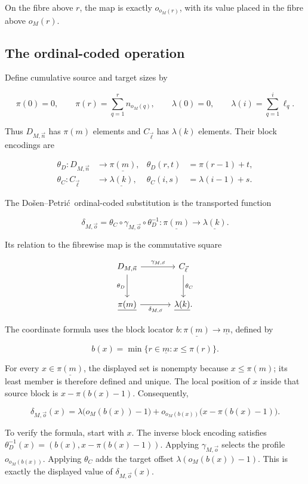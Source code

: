 \documentclass[11pt]{article}
\newcommand{\finord}[1]{\underline{#1}}
\newcommand{\DP}{Do\v{s}en--Petri\'{c}}
\theoremstyle{definition}
\begin{document}
On the fibre above \(r\), the map is exactly
\(o_{o_M(r)}\), with its value placed in the fibre above \(o_M(r)\).

\subsection{The ordinal-coded operation}

Define cumulative source and target sizes by

\[
\pi(0)=0,\qquad
\pi(r)=\sum_{q=1}^{r}n_{o_M(q)},
\qquad
\lambda(0)=0,\qquad
\lambda(i)=\sum_{q=1}^{i}\ell_q.
\]

Thus \(D_{M,\vec n}\) has \(\pi(m)\) elements and
\(C_{\vec\ell}\) has \(\lambda(k)\) elements. Their block encodings are

\[
\begin{aligned}
\theta_D:D_{M,\vec n}&\longrightarrow\finord{\pi(m)},
&\theta_D(r,t)&=\pi(r-1)+t,\\
\theta_C:C_{\vec\ell}&\longrightarrow\finord{\lambda(k)},
&\theta_C(i,s)&=\lambda(i-1)+s.
\end{aligned}
\]

The \DP\ ordinal-coded substitution is the transported function

\[
\delta_{M,\vec o}
=\theta_C\circ\gamma_{M,\vec o}\circ\theta_D^{-1}:
\finord{\pi(m)}\longrightarrow\finord{\lambda(k)}.
\]

Its relation to the fibrewise map is the commutative square

\[
\begin{tikzcd}[row sep=large,column sep=large]
D_{M,\vec n} \arrow[r,"\gamma_{M,\vec o}"] \arrow[d,"\theta_D"'] &
C_{\vec\ell} \arrow[d,"\theta_C"] \\
\finord{\pi(m)} \arrow[r,"\delta_{M,\vec o}"'] &
\finord{\lambda(k)}.
\end{tikzcd}
\]

The coordinate formula uses the block locator
\(b:\finord{\pi(m)}\to\finord m\), defined by

\[
b(x)=\min\{r\in\finord m:x\leq\pi(r)\}.
\]

For every \(x\in\finord{\pi(m)}\), the displayed set is nonempty because
\(x\leq\pi(m)\); its least member is therefore defined and unique.
The local position of \(x\) inside that source block is
\(x-\pi(b(x)-1)\). Consequently,

\[
\delta_{M,\vec o}(x)
=\lambda\bigl(o_M(b(x))-1\bigr)
+o_{o_M(b(x))}\bigl(x-\pi(b(x)-1)\bigr).
\]

To verify the formula, start with \(x\). The inverse block encoding satisfies
\(\theta_D^{-1}(x)=(b(x),x-\pi(b(x)-1))\). Applying \(\gamma_{M,\vec o}\)
selects the profile \(o_{o_M(b(x))}\). Applying \(\theta_C\) adds the target
offset \(\lambda(o_M(b(x))-1)\). This is exactly the displayed value of
\(\delta_{M,\vec o}(x)\).
\end{document}
